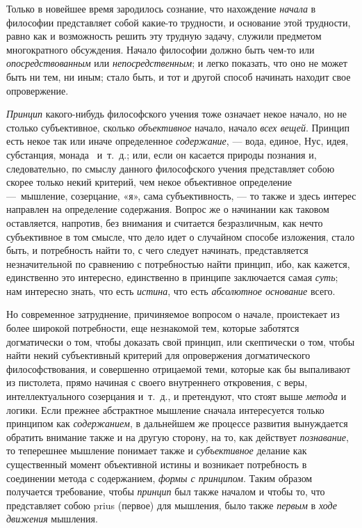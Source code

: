 \clearpage
Только в новейшее время зародилось сознание, что
нахождение {\em начала} в философии представляет собой
какие-то трудности, и основание этой трудности, равно как и возможность
решить эту трудную задачу, служили предметом многократного обсуждения.
Начало философии должно быть чем-то или
{\em опосредствованным} или
{\em непосредственным}; и легко показать, что оно не
может быть ни тем, ни иным; стало быть, и тот и другой способ начинать
находит свое опровержение.

{\em Принцип} какого-нибудь философского учения тоже
означает некое начало, но не столько субъективное, сколько
{\em объективное} начало, начало
{\em всех вещей}. Принцип есть некое так или иначе
определенное {\em содержание}, — вода, единое, Нус,
идея, субстанция,
монада~
и~т.~д.; или, если он касается природы познания и, следовательно, по смыслу
данного философского учения представляет собою скорее только некий
критерий, чем некое объективное определение —~мышление, созерцание, «я»,
сама субъективность, — то также и здесь интерес направлен на определение
содержания. Вопрос же о начинании как таковом оставляется, напротив, без
внимания и считается безразличным, как нечто субъективное в том смысле, что
дело идет о случайном способе изложения, стало быть, и потребность найти
то, с чего следует начинать, представляется незначительной по сравнению с
потребностью найти принцип, ибо, как кажется, единственно это интересно,
единственно в принципе заключается самая {\em суть};
нам интересно знать, что есть {\em истина}, что есть
{\em абсолютное основание} всего.

Но современное затруднение, причиняемое вопросом о начале, проистекает из
более широкой потребности, еще незнакомой тем, которые заботятся
догматически о том, чтобы доказать свой принцип, или скептически о том,
чтобы найти некий субъективный критерий для опровержения догматического
философствования, и совершенно отрицаемой теми, которые как бы выпаливают
из пистолета, прямо начиная с своего внутреннего откровения, с веры,
интеллектуального созерцания и~т.~д., и претендуют, что стоят выше
{\em метода} и логики. Если прежнее абстрактное
мышление сначала интересуется только принципом как
{\em содержанием}, в дальнейшем же процессе развития
вынуждается обратить внимание также и на другую сторону, на то, как
действует {\em познавание}, то теперешнее мышление
понимает также и {\em субъективное} делание как
существенный момент объективной истины и возникает потребность в соединении
метода с содержанием, {\em формы с принципом}. Таким
образом получается требование, чтобы {\em принцип} был
также началом и чтобы то, что представляет собою prius (первое) для
мышления, было также {\em первым} в
{\em ходе движения} мышления.

